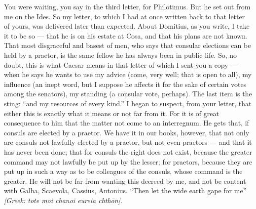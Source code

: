  You were waiting, you say in the third letter, for Philotimus. But he set out from me on the Ides. So my letter, to which I had at once written back to that letter of yours, was delivered later than expected. About Domitius, as you write, I take it to be so --- that he is on his estate at Cosa, and that his plans are not known. That most disgraceful and basest of men, who says that consular elections can be held by a praetor, is the same fellow he has always been in public life. So, no doubt, this is what Caesar means in that letter of which I sent you a copy --- when he says he wants to use my advice (come, very well; that is open to all), my influence (an inept word, but I suppose he affects it for the sake of certain votes among the senators), my standing (a consular vote, perhaps). The last item is the sting: ``and my resources of every kind.'' I began to suspect, from your letter, that either this is exactly what it means or not far from it. For it is of great consequence to him that the matter not come to an interregnum. He gets that, if consuls are elected by a praetor. We have it in our books, however, that not only are consuls not lawfully elected by a praetor, but not even praetors --- and that it has never been done; that for consuls the right does not exist, because the greater command may not lawfully be put up by the lesser; for praetors, because they are put up in such a way as to be colleagues of the consuls, whose command is the greater. He will not be far from wanting this decreed by me, and not be content with Galba, Scaevola, Cassius, Antonius. ``Then let the wide earth gape for me'' \textit{[Greek: tote moi chanoi eureia chth\=on]}.

